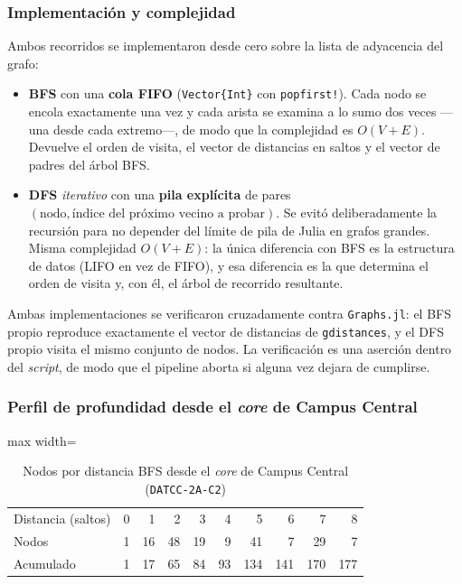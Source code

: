 \documentclass[10pt,a4paper]{extarticle}
\newcommand{\code}[1]{\texttt{\small #1}}
\begin{document}
\subsubsection{Implementación y complejidad}

Ambos recorridos se implementaron desde cero sobre la lista de adyacencia del grafo:

\begin{itemize}[leftmargin=*,itemsep=1.5mm]
\item \textbf{BFS} con una \textbf{cola FIFO} (\code{Vector\{Int\}} con \code{popfirst!}).
Cada nodo se encola exactamente una vez y cada arista se examina a lo sumo dos veces ---una
desde cada extremo---, de modo que la complejidad es $O(V+E)$. Devuelve el orden de visita,
el vector de distancias en saltos y el vector de padres del árbol BFS.

\item \textbf{DFS} \textit{iterativo} con una \textbf{pila explícita} de pares
$(\text{nodo}, \text{índice del próximo vecino a probar})$. Se evitó deliberadamente la
recursión para no depender del límite de pila de Julia en grafos grandes. Misma complejidad
$O(V+E)$: la única diferencia con BFS es la estructura de datos (LIFO en vez de FIFO), y esa
diferencia es la que determina el orden de visita y, con él, el árbol de recorrido
resultante.
\end{itemize}

Ambas implementaciones se verificaron cruzadamente contra \code{Graphs.jl}: el BFS propio
reproduce exactamente el vector de distancias de \code{gdistances}, y el DFS propio visita
el mismo conjunto de nodos. La verificación es una aserción dentro del \textit{script}, de
modo que el pipeline aborta si alguna vez dejara de cumplirse.

\subsubsection{Perfil de profundidad desde el \textit{core} de Campus Central}

\begin{table}[H]
\centering
\caption{Nodos por distancia BFS desde el \textit{core} de Campus Central (\code{DATCC-2A-C2})}
\label{tab:perfilcore}
\small
\begin{adjustbox}{max width=\textwidth}
\begin{tabular}{lrrrrrrrrr}
\toprule
Distancia (saltos) & 0 & 1 & 2 & 3 & 4 & 5 & 6 & 7 & 8 \\
Nodos              & 1 & 16 & 48 & 19 & 9 & 41 & 7 & 29 & 7 \\
Acumulado          & 1 & 17 & 65 & 84 & 93 & 134 & 141 & 170 & 177 \\
\bottomrule
\end{tabular}
\end{adjustbox}
\end{table}
\end{document}
